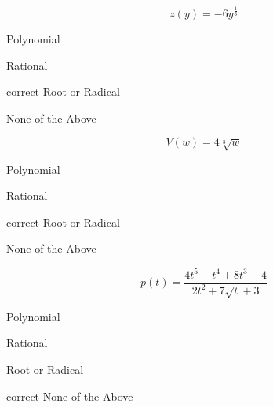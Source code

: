 \documentclass{ximera}
\begin{document}
\begin{exercise}
\begin{question}


\[
z(y) = -6 y^{\tfrac{1}{3}}
\]

\begin{multipleChoice}
\item {Polynomial}
\item {Rational}
\item [correct]{Root or Radical}
\item {None of the Above}
\end{multipleChoice}


\end{question}










\begin{question}


\[
V(w) = 4 \sqrt[3]{w}
\]

\begin{multipleChoice}
\item {Polynomial}
\item {Rational}
\item [correct]{Root or Radical}
\item {None of the Above}
\end{multipleChoice}


\end{question}













\begin{question}


\[
p(t) = \frac{4t^5 - t^4 + 8t^3 - 4}{2t^2 + 7\sqrt{t} + 3}
\]

\begin{multipleChoice}
\item {Polynomial}
\item {Rational}
\item {Root or Radical}
\item [correct]{None of the Above}
\end{multipleChoice}


\end{question}










\end{exercise}
\end{document}
